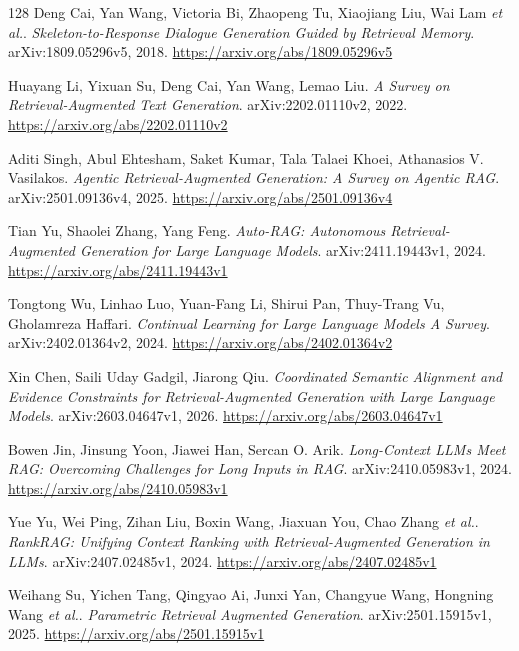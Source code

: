 \documentclass[11pt,a4paper]{article}
\begin{document}
\begin{thebibliography}{128}
Deng Cai, Yan Wang, Victoria Bi, Zhaopeng Tu, Xiaojiang Liu, Wai Lam \emph{et al.}.
\newblock \emph{Skeleton-to-Response Dialogue Generation Guided by Retrieval Memory}.
\newblock arXiv:1809.05296v5, 2018.
\newblock \url{https://arxiv.org/abs/1809.05296v5}

Huayang Li, Yixuan Su, Deng Cai, Yan Wang, Lemao Liu.
\newblock \emph{A Survey on Retrieval-Augmented Text Generation}.
\newblock arXiv:2202.01110v2, 2022.
\newblock \url{https://arxiv.org/abs/2202.01110v2}

Aditi Singh, Abul Ehtesham, Saket Kumar, Tala Talaei Khoei, Athanasios V. Vasilakos.
\newblock \emph{Agentic Retrieval-Augmented Generation: A Survey on Agentic RAG}.
\newblock arXiv:2501.09136v4, 2025.
\newblock \url{https://arxiv.org/abs/2501.09136v4}

Tian Yu, Shaolei Zhang, Yang Feng.
\newblock \emph{Auto-RAG: Autonomous Retrieval-Augmented Generation for Large Language Models}.
\newblock arXiv:2411.19443v1, 2024.
\newblock \url{https://arxiv.org/abs/2411.19443v1}

Tongtong Wu, Linhao Luo, Yuan-Fang Li, Shirui Pan, Thuy-Trang Vu, Gholamreza Haffari.
\newblock \emph{Continual Learning for Large Language Models A Survey}.
\newblock arXiv:2402.01364v2, 2024.
\newblock \url{https://arxiv.org/abs/2402.01364v2}

Xin Chen, Saili Uday Gadgil, Jiarong Qiu.
\newblock \emph{Coordinated Semantic Alignment and Evidence Constraints for Retrieval-Augmented Generation with Large Language Models}.
\newblock arXiv:2603.04647v1, 2026.
\newblock \url{https://arxiv.org/abs/2603.04647v1}

Bowen Jin, Jinsung Yoon, Jiawei Han, Sercan O. Arik.
\newblock \emph{Long-Context LLMs Meet RAG: Overcoming Challenges for Long Inputs in RAG}.
\newblock arXiv:2410.05983v1, 2024.
\newblock \url{https://arxiv.org/abs/2410.05983v1}

Yue Yu, Wei Ping, Zihan Liu, Boxin Wang, Jiaxuan You, Chao Zhang \emph{et al.}.
\newblock \emph{RankRAG: Unifying Context Ranking with Retrieval-Augmented Generation in LLMs}.
\newblock arXiv:2407.02485v1, 2024.
\newblock \url{https://arxiv.org/abs/2407.02485v1}

Weihang Su, Yichen Tang, Qingyao Ai, Junxi Yan, Changyue Wang, Hongning Wang \emph{et al.}.
\newblock \emph{Parametric Retrieval Augmented Generation}.
\newblock arXiv:2501.15915v1, 2025.
\newblock \url{https://arxiv.org/abs/2501.15915v1}


\end{thebibliography}
\end{document}
